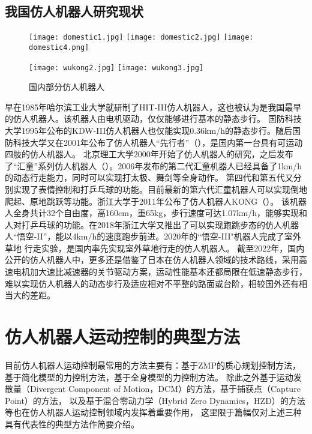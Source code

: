 \subsection{我国仿人机器人研究现状}
\begin{figure}[htbp]
    \centering
        {%
            \texttt{[image: domestic1.jpg]}}
        {%
            \texttt{[image: domestic2.jpg]}}
        {%
            \texttt{[image: domestic4.png]}}     
    
        {%
            \texttt{[image: wukong2.jpg]}}
        {%
            \texttt{[image: wukong3.jpg]}}            
    \caption{国内部分仿人机器人\label{fig:domes_biped}}
\end{figure}
早在1985年哈尔滨工业大学就研制了HIT-III仿人机器人，这也被认为是我国最早的仿人机器人\cite{谢涛2002}。该机器人由电机驱动，仅仅能够进行基本的静态步行。
国防科技大学1995年公布的KDW-III仿人机器人也仅能实现0.36km/h的静态步行。随后国防科技大学又在2001年公布了仿人机器人“先行者”（），是国内第一台具有可运动四肢的仿人机器人。
北京理工大学2000年开始了仿人机器人的研究，之后发布了“汇童”系列仿人机器人（）。2006年发布的第二代汇童机器人已经具备了1km/h的动态行走能力，同时可以实现打太极、舞剑等全身动作。
第四代和第五代又分别实现了表情控制和打乒乓球的功能。目前最新的第六代汇童机器人可以实现倒地爬起、原地跳跃等功能\cite{huang2019historical}。浙江大学于2011年公布了仿人机器人KONG\cite{sun2011balance}（）。
该机器人全身共计32个自由度，高160cm，重65kg，步行速度可达1.07km/h，能够实现和人对打乒乓球的功能。在2018年浙江大学又推出了可以实现跑跳步态的仿人机器人“悟空-II”，能以4km/h的速度跑步前进。2020年的“悟空-III"机器人完成了室外草地
行走实验，是国内率先实现室外草地行走的仿人机器人。
截至2022年，国内公开的仿人机器人中，更多还是借鉴了日本在仿人机器人领域的技术路线，采用高速电机加大速比减速器的关节驱动方案，运动性能基本还都局限在低速静态步行，
难以实现仿人机器人的动态步行及适应相对不平整的路面或台阶，相较国外还有相当大的差距。
\section{仿人机器人运动控制的典型方法}
目前仿人机器人运动控制最常用的方法主要有：基于ZMP的质心规划控制方法，基于简化模型的力控制方法，基于全身模型的力控制方法。
除此之外基于运动发散量（Divergent Component of Motion，DCM）的方法\cite{mesesan2019dynamic}，基于捕获点（Capture Point）的方法\cite{koolen2012capturability}，
以及基于混合零动力学（Hybrid Zero Dynamics，HZD）的方法\cite{hereid2019rapid}等也在仿人机器人运动控制领域内发挥着重要作用，
这里限于篇幅仅对上述三种具有代表性的典型方法作简要介绍。
